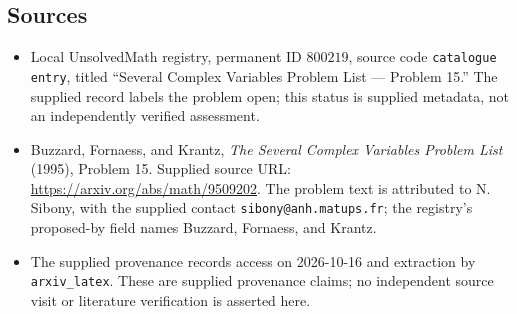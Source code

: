\documentclass[11pt]{article}
\begin{document}
\subsection{Sources}
\begin{itemize}
\item Local UnsolvedMath registry, permanent ID \(800219\), source code \texttt{catalogue entry}, titled ``Several Complex Variables Problem List --- Problem 15.'' The supplied record labels the problem open; this status is supplied metadata, not an independently verified assessment.
\item Buzzard, Fornaess, and Krantz, \emph{The Several Complex Variables Problem List} (1995), Problem 15. Supplied source URL: \url{https://arxiv.org/abs/math/9509202}. The problem text is attributed to N. Sibony, with the supplied contact \texttt{sibony@anh.matups.fr}; the registry's proposed-by field names Buzzard, Fornaess, and Krantz.
\item The supplied provenance records access on 2026-10-16 and extraction by \texttt{arxiv\_latex}. These are supplied provenance claims; no independent source visit or literature verification is asserted here.
\end{itemize}
\end{document}

